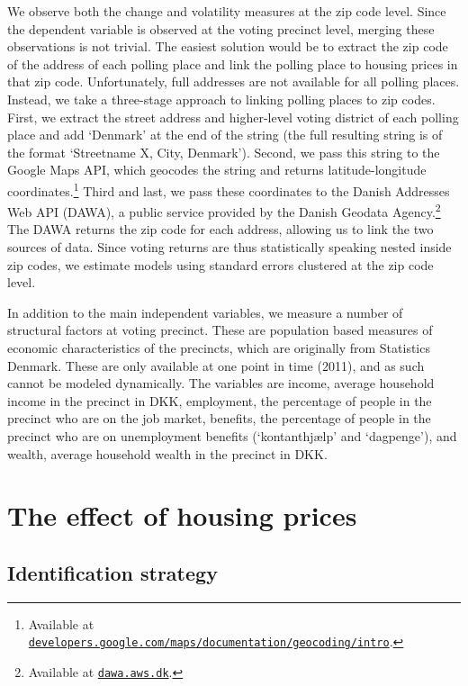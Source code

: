 \documentclass[12pt,a4paper]{article}
\begin{document}
We observe both the change and volatility measures at the zip code level. Since the dependent variable is observed at the voting precinct level, merging these observations is not trivial. The easiest solution would be to extract the zip code of the address of each polling place and link the polling place to housing prices in that zip code. Unfortunately, full addresses are not available for all polling places. Instead, we take a three-stage approach to linking polling places to zip codes. First, we extract the street address and higher-level voting district of each polling place and add `Denmark' at the end of the string (the full resulting string is of the format `Streetname X, City, Denmark'). Second, we pass this string to the Google Maps API, which geocodes the string and returns latitude-longitude coordinates.\footnote{Available at \texttt{\href{https://developers.google.com/maps/documentation/geocoding/intro}{developers.google.com/maps/documentation/geocoding/intro}}.} Third and last, we pass these coordinates to the Danish Addresses Web API (DAWA), a public service provided by the Danish Geodata Agency.\footnote{Available at \texttt{\href{http://dawa.aws.dk/}{dawa.aws.dk}}.} The DAWA returns the zip code for each address, allowing us to link the two sources of data. Since voting returns are thus statistically speaking nested inside zip codes, we estimate models using standard errors clustered at the zip code level.

In addition to the main independent variables, we measure a number of structural factors at voting precinct. These are population based measures of economic characteristics of the precincts, which are originally from Statistics Denmark. These are only available at one point in time (2011), and as such cannot be modeled dynamically. The variables are income, average household income in the precinct in DKK, employment, the percentage of people in the precinct who are on the job market, benefits, the percentage of people in the precinct who are on unemployment benefits (`kontanthjælp' and `dagpenge'), and wealth, average household wealth in the precinct in DKK.  


\section{The effect of housing prices}

\subsection{Identification strategy}
\end{document}
